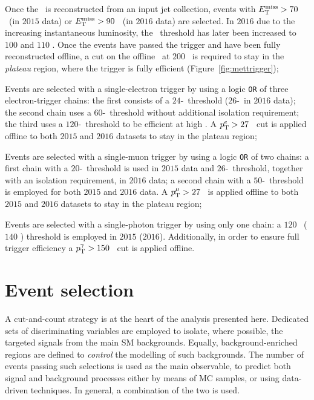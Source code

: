 		Once the \met\ is reconstructed from an input jet collection, events with $E_{\mathrm{T}}^{\mathrm{miss}} > 70$ \GeV\ (in $2015$ data) or $E_{\mathrm{T}}^{\mathrm{miss}} > 90$ \GeV\ (in $2016$ data) are selected. In $2016$ due to the increasing instantaneous luminosity, the \met\ threshold has later been increased to $100$ and $110$ \GeV. Once the events have passed the trigger and have been fully reconstructed offline, a cut on the offline \met\ at $200$ \GeV\ is required to stay in the \emph{plateau} region, where the trigger is fully efficient (Figure~\ref{fig:mettrigger});

		Events are selected with a single-electron trigger by using a logic \texttt{OR} of three electron-trigger chains: the first consists of a $24$-\GeV\ threshold ($26$-\GeV\ in $2016$ data); the second chain uses a $60$-\GeV\ threshold without additional isolation requirement; the third uses a $120$-\GeV\ threshold to be efficient at high \et. A $p_{\mathrm{T}}^e > 27$ \GeV\ cut is applied offline to both $2015$ and $2016$ datasets to stay in the plateau region;

		Events are selected with a single-muon trigger by using a logic \texttt{OR} of two chains: a first chain with a $20$-\GeV\ threshold is used in $2015$ data and $26$-\GeV\ threshold, together with an isolation requirement, in $2016$ data; a second chain with a $50$-\GeV\ threshold is employed for both $2015$ and $2016$ data. A $p_{\mathrm{T}}^\mu > 27$ \GeV\ is applied offline to both $2015$ and $2016$ datasets to stay in the plateau region;

		Events are selected with a single-photon trigger by using only one chain: a $120$ \GeV\ ($140$ \GeV) threshold is employed in $2015$ ($2016$). Additionally, in order to ensure full trigger efficiency a $p_{\mathrm{T}}^\gamma > 150$ \GeV\ cut is applied offline.


	\section{Event selection}
	\label{sec:evtsel}

		A cut-and-count strategy is at the heart of the analysis presented here. Dedicated sets of discriminating variables are employed to isolate, where possible, the targeted signals from the main \ac{SM} backgrounds. Equally, background-enriched regions are defined to \emph{control} the modelling of such backgrounds. The number of events passing such selections is used as the main observable, to predict both signal and background processes either by means of \ac{MC} samples, or using data-driven techniques. In general, a combination of the two is used. 

